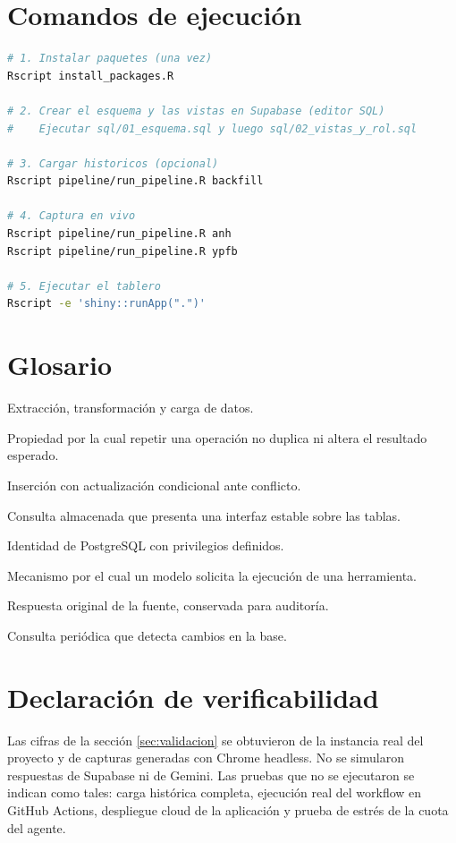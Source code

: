 \documentclass[12pt,a4paper]{article}
\begin{document}
\section{Comandos de ejecución}

\begin{lstlisting}[language=bash,caption={Secuencia de ejecucion reproducida.}]
# 1. Instalar paquetes (una vez)
Rscript install_packages.R

# 2. Crear el esquema y las vistas en Supabase (editor SQL)
#    Ejecutar sql/01_esquema.sql y luego sql/02_vistas_y_rol.sql

# 3. Cargar historicos (opcional)
Rscript pipeline/run_pipeline.R backfill

# 4. Captura en vivo
Rscript pipeline/run_pipeline.R anh
Rscript pipeline/run_pipeline.R ypfb

# 5. Ejecutar el tablero
Rscript -e 'shiny::runApp(".")'
\end{lstlisting}

\section{Glosario}

\begin{description}[leftmargin=1.2cm]
  \item[ETL] Extracción, transformación y carga de datos.
  \item[Idempotencia] Propiedad por la cual repetir una operación no duplica ni altera el resultado esperado.
  \item[Upsert] Inserción con actualización condicional ante conflicto.
  \item[Vista] Consulta almacenada que presenta una interfaz estable sobre las tablas.
  \item[Rol] Identidad de PostgreSQL con privilegios definidos.
  \item[Function calling] Mecanismo por el cual un modelo solicita la ejecución de una herramienta.
  \item[Crudo] Respuesta original de la fuente, conservada para auditoría.
  \item[Latido] Consulta periódica que detecta cambios en la base.
\end{description}

\section{Declaración de verificabilidad}

Las cifras de la sección \ref{sec:validacion} se obtuvieron de la instancia real del proyecto y de capturas generadas con Chrome headless. No se simularon respuestas de Supabase ni de Gemini. Las pruebas que no se ejecutaron se indican como tales: carga histórica completa, ejecución real del workflow en GitHub Actions, despliegue cloud de la aplicación y prueba de estrés de la cuota del agente.
\end{document}
